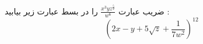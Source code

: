 \p
ضریب عبارت
$\frac{x^3 y z^{\frac{5}{2}}}{w^6}$
را در بسط عبارت زیر بیابید :
  $$(2x - y + 5\sqrt{z} + \frac{1}{7w^2})^{12}$$